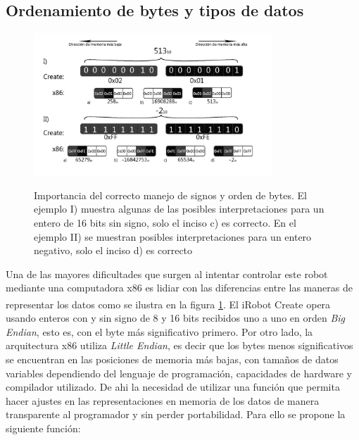 \documentclass[letterpaper,openright,12pt]{book}
\begin{document}
\subsection{Ordenamiento de bytes y tipos de datos}
\begin{figure}
\begin{center}
\includegraphics[width=0.8\textwidth]{figures/endianess.png}
\caption{Importancia del correcto manejo de signos y orden de bytes. El ejemplo I) muestra algunas de las posibles interpretaciones para un entero de 16 bits sin signo, solo el inciso c) es correcto. En el ejemplo II) se muestran posibles interpretaciones para un entero negativo, solo el inciso d) es correcto}
\centering
\label{fig:endianess}
\end{center}
\end{figure} 
Una de las mayores dificultades que surgen al intentar controlar este robot mediante una computadora x86 es lidiar con las diferencias entre las maneras de representar los datos como se ilustra en la figura \ref{fig:endianess}. El iRobot Create\textsuperscript{\textregistered} opera usando enteros con y sin signo de 8 y 16 bits recibidos uno a uno en orden \emph{Big Endian}, esto es, con el byte más significativo primero. Por otro lado, la arquitectura x86 utiliza \emph{Little Endian}, es decir que los bytes menos significativos se encuentran en las posiciones de memoria más bajas, con tamaños de datos variables dependiendo del lenguaje de programación, capacidades de hardware y compilador utilizado. De ahi la necesidad de utilizar una función que permita hacer ajustes en las representaciones en memoria de los datos de manera transparente al programador y sin perder portabilidad. Para ello se propone la siguiente función:\label{sec:endianess}
\end{document}
